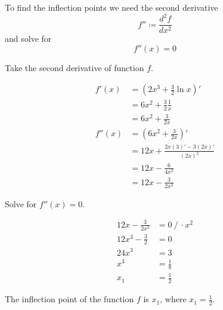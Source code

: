 \begin{center}
    To find the inflection points we need the second derivative
    $$ f'' \coloneq \frac{d^{2}f}{dx^{2}} $$
    and solve for
    $$ f''(x) = 0 $$
\end{center}

Take the second derivative of function $f$.

\begin{align}
    f'(x) &= \left( 2x^{3} + \frac{3}{2}\ln{x} \right)' \\
    &= 6x^{2} + \frac{3}{2}\frac{1}{x} \\
    &= 6x^{2} + \frac{3}{2x} \\
    f''(x) &= \left( 6x^{2} + \frac{3}{2x} \right)' \\
    &= 12x + \frac{2x(3)' - 3(2x)'}{(2x)^{2}} \\
    &= 12x - \frac{6}{4x^{2}} \\
    &= 12x - \frac{3}{2x^{2}}
\end{align}

Solve for $f''(x) = 0$.

\begin{align}
    12x - \frac{3}{2x^{2}} &= 0\ /\ \cdot x^{2}  \\
    12x^{3} - \frac{3}{2} &= 0 \\
    24x^{3} &= 3 \\
    x^{3} &= \frac{1}{8} \\
    x_{1} &= \frac{1}{2} 
\end{align}

The inflection point of the function $f$ 
is $x_{1}$, where $x_{1} = \frac{1}{2}$.

